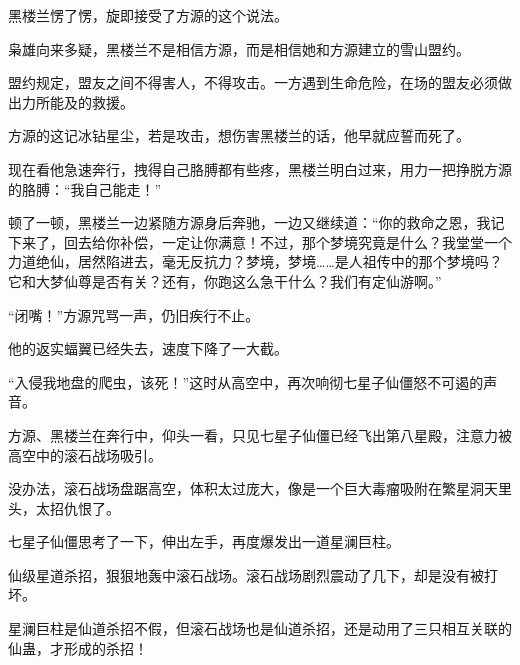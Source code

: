 \begin{this_body}
黑楼兰愣了愣，旋即接受了方源的这个说法。

枭雄向来多疑，黑楼兰不是相信方源，而是相信她和方源建立的雪山盟约。

盟约规定，盟友之间不得害人，不得攻击。一方遇到生命危险，在场的盟友必须做出力所能及的救援。

方源的这记冰钻星尘，若是攻击，想伤害黑楼兰的话，他早就应誓而死了。

现在看他急速奔行，拽得自己胳膊都有些疼，黑楼兰明白过来，用力一把挣脱方源的胳膊：“我自己能走！”

顿了一顿，黑楼兰一边紧随方源身后奔驰，一边又继续道：“你的救命之恩，我记下来了，回去给你补偿，一定让你满意！不过，那个梦境究竟是什么？我堂堂一个力道绝仙，居然陷进去，毫无反抗力？梦境，梦境……是人祖传中的那个梦境吗？它和大梦仙尊是否有关？还有，你跑这么急干什么？我们有定仙游啊。”

“闭嘴！”方源咒骂一声，仍旧疾行不止。

他的返实蝠翼已经失去，速度下降了一大截。

“入侵我地盘的爬虫，该死！”这时从高空中，再次响彻七星子仙僵怒不可遏的声音。

方源、黑楼兰在奔行中，仰头一看，只见七星子仙僵已经飞出第八星殿，注意力被高空中的滚石战场吸引。

没办法，滚石战场盘踞高空，体积太过庞大，像是一个巨大毒瘤吸附在繁星洞天里头，太招仇恨了。

七星子仙僵思考了一下，伸出左手，再度爆发出一道星澜巨柱。

仙级星道杀招，狠狠地轰中滚石战场。滚石战场剧烈震动了几下，却是没有被打坏。

星澜巨柱是仙道杀招不假，但滚石战场也是仙道杀招，还是动用了三只相互关联的仙蛊，才形成的杀招！

\end{this_body}

